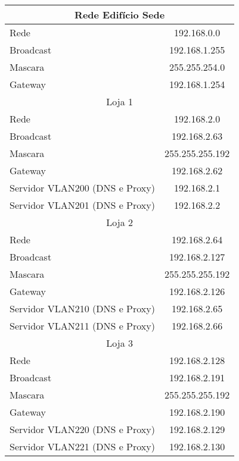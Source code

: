 \documentclass[a4paper,12pt]{article}
\begin{document}
\begin{table}[ht]
   \centering
   \begin{tabular}{ l | c }
      \toprule
      \multicolumn{2}{c}{Rede Edifício Sede} \\\hline 
      Rede & 192.168.0.0 \\\hline 
      Broadcast & 192.168.1.255 \\\hline 
      Mascara & 255.255.254.0 \\\hline
      Gateway & 192.168.1.254 \\\hline

      \multicolumn{2}{c}{Loja 1} \\\hline 
      Rede & 192.168.2.0 \\\hline 
      Broadcast & 192.168.2.63 \\\hline 
      Mascara & 255.255.255.192 \\\hline
      Gateway & 192.168.2.62 \\\hline
      Servidor VLAN200 (DNS e Proxy) & 192.168.2.1 \\\hline
      Servidor VLAN201 (DNS e Proxy) & 192.168.2.2 \\\hline
      \multicolumn{2}{c}{Loja 2} \\\hline 
      Rede & 192.168.2.64 \\\hline 
      Broadcast & 192.168.2.127 \\\hline 
      Mascara & 255.255.255.192 \\\hline
      Gateway & 192.168.2.126 \\\hline
      Servidor VLAN210 (DNS e Proxy) & 192.168.2.65 \\\hline
      Servidor VLAN211 (DNS e Proxy) & 192.168.2.66 \\\hline
      \multicolumn{2}{c}{Loja 3} \\\hline 
      Rede & 192.168.2.128 \\\hline 
      Broadcast & 192.168.2.191 \\\hline 
      Mascara & 255.255.255.192 \\\hline
      Gateway & 192.168.2.190 \\\hline
      Servidor VLAN220 (DNS e Proxy) & 192.168.2.129 \\\hline
      Servidor VLAN221 (DNS e Proxy) & 192.168.2.130 \\\hline


\end{tabular}
\end{table}
\end{document}
